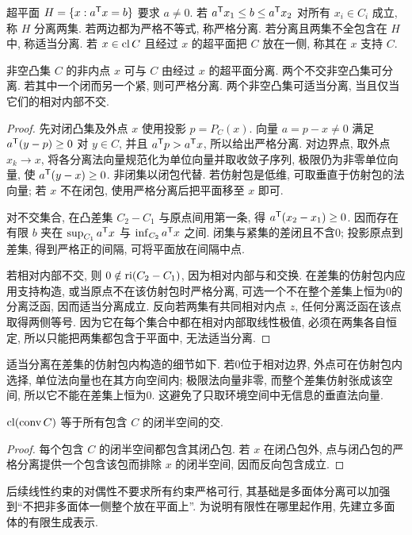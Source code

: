 \begin{definition}
超平面 $H=\{x:a^{\mathsf T} x=b\}$ 要求 $a\ne0$. 若 $a^{\mathsf T} x_1\le b\le a^{\mathsf T} x_2$ 对所有 $x_i\in C_i$ 成立, 称 $H$ 分离两集. 若两边都为严格不等式, 称严格分离. 若分离且两集不全包含在 $H$ 中, 称适当分离. 若 $x\in\operatorname{cl} C$ 且经过 $x$ 的超平面把 $C$ 放在一侧, 称其在 $x$ 支持 $C$.
\end{definition}
\begin{theorem}\label{thm:separation}
非空凸集 $C$ 的非内点 $x$ 可与 $C$ 由经过 $x$ 的超平面分离. 两个不交非空凸集可分离. 若其中一个闭而另一个紧, 则可严格分离. 两个非空凸集可适当分离, 当且仅当它们的相对内部不交.
\end{theorem}
\begin{proof}
先对闭凸集及外点 $x$ 使用投影 $p=P_C(x)$. 向量 $a=p-x\ne0$ 满足 $a^{\mathsf T}(y-p)\ge0$ 对 $y\in C$, 并且 $a^{\mathsf T} p>a^{\mathsf T} x$, 所以给出严格分离. 对边界点, 取外点 $x_k\to x$, 将各分离法向量规范化为单位向量并取收敛子序列, 极限仍为非零单位向量, 使 $a^{\mathsf T}(y-x)\ge0$. 非闭集以闭包代替. 若仿射包是低维, 可取垂直于仿射包的法向量; 若 $x$ 不在闭包, 使用严格分离后把平面移至 $x$ 即可.

对不交集合, 在凸差集 $C_2-C_1$ 与原点间用第一条, 得 $a^{\mathsf T}(x_2-x_1)\ge0$. 因而存在有限 $b$ 夹在 $\sup_{C_1}a^{\mathsf T} x$ 与 $\inf_{C_2}a^{\mathsf T} x$ 之间. 闭集与紧集的差闭且不含0; 投影原点到差集, 得到严格正的间隔, 可将平面放在间隔中点.

若相对内部不交, 则 $0\notin\operatorname{ri}(C_2-C_1)$, 因为相对内部与和交换. 在差集的仿射包内应用支持构造, 或当原点不在该仿射包时严格分离, 可选一个不在整个差集上恒为0的分离泛函, 因而适当分离成立. 反向若两集有共同相对内点 $z$, 任何分离泛函在该点取得两侧等号. 因为它在每个集合中都在相对内部取线性极值, 必须在两集各自恒定, 所以只能把两集都包含于平面中, 无法适当分离.
\end{proof}
适当分离在差集的仿射包内构造的细节如下. 若0位于相对边界, 外点可在仿射包内选择, 单位法向量也在其方向空间内; 极限法向量非零, 而整个差集仿射张成该空间, 所以它不能在差集上恒为0. 这避免了只取环境空间中无信息的垂直法向量.

\begin{corollary}
$\operatorname{cl}(\operatorname{conv} C)$ 等于所有包含 $C$ 的闭半空间的交.
\end{corollary}
\begin{proof}
每个包含 $C$ 的闭半空间都包含其闭凸包. 若 $x$ 在闭凸包外, 点与闭凸包的严格分离提供一个包含该包而排除 $x$ 的闭半空间, 因而反向包含成立.
\end{proof}

后续线性约束的对偶性不要求所有约束严格可行, 其基础是多面体分离可以加强到“不把非多面体一侧整个放在平面上”. 为说明有限性在哪里起作用, 先建立多面体的有限生成表示.

